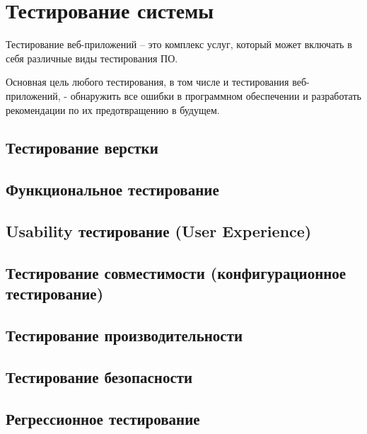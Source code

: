 \newpage

\section{Тестирование системы}

Тестирование веб-приложений – это комплекс услуг,
который может включать в себя различные виды тестирования ПО.

Основная цель любого тестирования,
в том числе и тестирования веб-приложений, - обнаружить все ошибки в программном обеспечении
и разработать рекомендации по их предотвращению в будущем.

\subsection{Тестирование верстки}
\subsection{Функциональное тестирование}
\subsection{Usability тестирование (User Experience)}
\subsection{Тестирование совместимости (конфигурационное тестирование)}
\subsection{Тестирование производительности}
\subsection{Тестирование безопасности}
\subsection{Регрессионное тестирование}

\newpage
